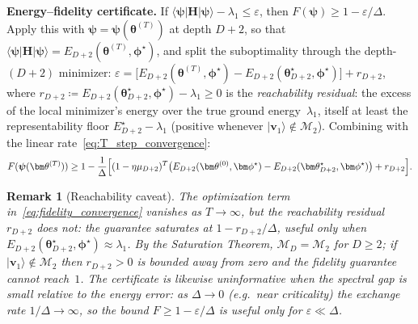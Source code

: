 \documentclass[11pt]{article}
\newcommand{\cM}{\mathcal{M}}
\theoremstyle{plain}
\theoremstyle{plain}
\newtheorem{remark}[theorem]{Remark}
\begin{document}
\medskip\noindent\textbf{Energy--fidelity certificate.}
If $\langle\boldsymbol{\psi}|\mathbf{H}|\boldsymbol{\psi}\rangle-\lambda_1\le\varepsilon$, then
$F(\boldsymbol{\psi})\ge 1-\varepsilon/\Delta$.
Apply this with $\boldsymbol{\psi}=\boldsymbol{\psi}(\bm\theta^{(T)})$ at depth $D{+}2$, so that
$\langle\boldsymbol{\psi}|\mathbf{H}|\boldsymbol{\psi}\rangle=E_{D+2}(\bm\theta^{(T)},\bm\phi^\star)$, and split
the suboptimality through the depth-$(D{+}2)$ minimizer:
$\varepsilon=\bigl[E_{D+2}(\bm\theta^{(T)},\bm\phi^\star)
-E_{D+2}(\bm\theta_{D+2}^\star,\bm\phi^\star)\bigr]+r_{D+2}$, where
$r_{D+2}\coloneqq E_{D+2}(\bm\theta_{D+2}^\star,\bm\phi^\star)-\lambda_1\ge 0$
is the \emph{reachability residual}: the excess of the local minimizer's
energy over the true ground energy~$\lambda_1$, itself at least the
representability floor $E_{D+2}^\star-\lambda_1$ (positive whenever
$|\mathbf{v}_1\rangle\notin\cM_2$).  Combining with the linear
rate~\eqref{eq:T_step_convergence}:
\begin{equation}\label{eq:fidelity_convergence}
  F(\boldsymbol{\psi}(\bm\theta^{(T)}))
  \ge 1-\frac{1}{\Delta}\Bigl[
    (1-\eta\mu_{D+2})^T
    \bigl(E_{D+2}(\bm\theta^{(0)},\bm\phi^\star)
    -E_{D+2}(\bm\theta_{D+2}^\star,\bm\phi^\star)\bigr)
    +r_{D+2}\Bigr].
\end{equation}
\begin{remark}[Reachability caveat]\label{rem:reachability}
  The optimization term in~\eqref{eq:fidelity_convergence} vanishes as
  $T\to\infty$, but the reachability residual $r_{D+2}$ does not: the
  guarantee saturates at $1-r_{D+2}/\Delta$, useful only when
  $E_{D+2}(\bm\theta_{D+2}^\star,\bm\phi^\star)\approx\lambda_1$.
  By the Saturation Theorem, $\cM_D=\cM_2$ for $D\ge 2$; if
  $|\mathbf{v}_1\rangle\notin\cM_2$ then $r_{D+2}>0$ is bounded away from zero and
  the fidelity guarantee cannot reach~$1$.  The certificate is likewise
  uninformative when the spectral gap is small relative to the energy
  error: as $\Delta\to0$ (e.g.\ near criticality) the exchange rate
  $1/\Delta\to\infty$, so the bound $F\ge1-\varepsilon/\Delta$ is useful
  only for $\varepsilon\ll\Delta$.
\end{remark}
\end{document}
